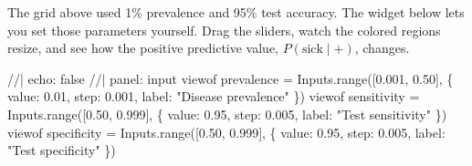 \documentclass[
  letterpaper,
  11pt,
  twoside,
  openany]{scrbook}
\newenvironment{Shaded}{\begin{snugshade}}{\end{snugshade}}
\newcommand{\NormalTok}[1]{\textcolor[rgb]{0.33,0.33,0.33}{#1}}
\begin{document}
The grid above used 1\% prevalence and 95\% test accuracy. The widget
below lets you set those parameters yourself. Drag the sliders, watch
the colored regions resize, and see how the positive predictive value,
\(P(\text{sick} \mid +)\), changes.

\begin{Shaded}
\begin{Highlighting}[]
\NormalTok{//| echo: false}
\NormalTok{//| panel: input}
\NormalTok{viewof prevalence = Inputs.range([0.001, 0.50], \{ value: 0.01, step: 0.001, label: "Disease prevalence" \})}
\NormalTok{viewof sensitivity = Inputs.range([0.50, 0.999], \{ value: 0.95, step: 0.005, label: "Test sensitivity" \})}
\NormalTok{viewof specificity = Inputs.range([0.50, 0.999], \{ value: 0.95, step: 0.005, label: "Test specificity" \})}
\end{Highlighting}
\end{Shaded}
\end{document}
